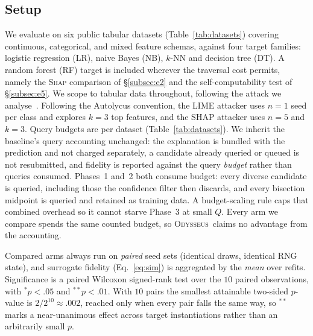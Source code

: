 \documentclass[sigconf,anonymous,review]{acmart}
\newcommand{\sys}{\textsc{Odysseus}}
\begin{document}
\subsection{Setup}
\label{subsec:setup}
We evaluate on six public tabular datasets (Table~\ref{tab:datasets}) covering continuous,
categorical, and mixed feature schemas, against four target families: logistic regression (LR), naive
Bayes (NB), $k$-NN and decision tree (DT). A random forest (RF) target is included wherever the
traversal cost permits, namely the \textsc{Shap} comparison of \S\ref{subsec:e2} and the
self-computability test of \S\ref{subsec:e5}. We scope to tabular data throughout,
following the attack we analyse~\cite{oksuz2024autolycus}. Following the Autolycus convention, the
LIME attacker uses $n{=}1$
seed per class and explores $k{=}3$ top features, and the SHAP attacker uses $n{=}5$ and $k{=}3$.
Query budgets are per dataset (Table~\ref{tab:datasets}). We inherit the baseline's query
accounting unchanged: the explanation is bundled with the prediction and not charged separately, a
candidate already queried or queued is not resubmitted, and fidelity is reported against the query
\emph{budget} rather than queries consumed. Phases~1 and~2 both consume budget: every diverse
candidate is queried, including those the confidence filter then discards, and every bisection
midpoint is queried and retained as training data. A budget-scaling rule caps that combined overhead
so it cannot starve Phase~3 at small $Q$. Every arm we compare spends the same counted budget, so
\sys\ claims no advantage from the accounting.

Compared arms always run on \emph{paired} seed sets (identical draws, identical RNG state), and
surrogate fidelity (Eq.~\ref{eq:sim}) is aggregated by the \emph{mean} over refits. Significance is a
paired Wilcoxon signed-rank test over the $10$ paired observations, with $^{*}p{<}.05$ and
$^{**}p{<}.01$. With $10$ pairs the smallest attainable two-sided $p$-value is $2/2^{10}\approx.002$,
reached only when every pair falls the same way, so $^{**}$ marks a near-unanimous effect across
target instantiations rather than an arbitrarily small $p$.
\end{document}
